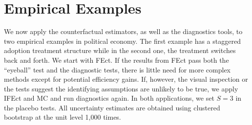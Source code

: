 \documentclass[12pt]{article}
\begin{document}
\section{Empirical Examples}\label{sc:examples}

We now apply the counterfactual estimators, as well as the diagnostics tools, to two empirical examples in political economy. The first example has a staggered adoption treatment structure while in the second one, the treatment switches back and forth. We start with FEct. If the results from FEct pass both the ``eyeball'' test and the diagnostic tests, there is little need for more complex methods except for potential efficiency gains. If, however, the visual inspection or the tests suggest the identifying assumptions are unlikely to be true, we apply IFEct and MC and run diagnostics again. In both applications, we set $S = 3$ in the placebo tests. All uncertainty estimates are obtained using clustered bootstrap at the unit level 1,000 times. 
\end{document}
